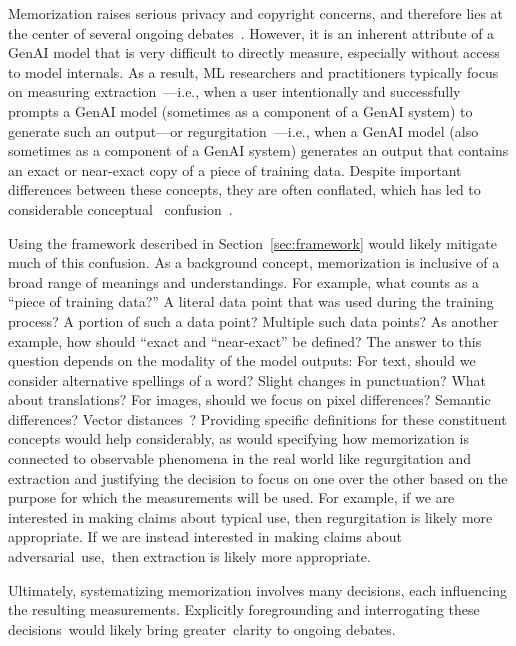 \documentclass{article}
\begin{document}
Memorization raises serious privacy and copyright concerns, and therefore lies at the center of several ongoing debates~\citep{lee2023talkin}. However, it is an inherent attribute of a GenAI model that is very difficult to directly measure, especially without access to model internals. As a result, ML researchers and practitioners typically focus on measuring extraction~\citep[e.g.,][]{carlini2023quantifying,nasr2023scalable,prashanth2024recite}---i.e., when a user intentionally and successfully prompts a GenAI model (sometimes as a component of a GenAI system) to generate such an output---or
regurgitation~\citep[e.g.,][]{aerni2024measuring}---i.e., when a GenAI model (also sometimes as a component of a GenAI system) generates an output that contains an exact or near-exact copy of a piece of training data. Despite important differences between these concepts, they are often conflated, which has led to considerable conceptual~ confusion~\cite{cooper2024files}.

Using the framework described in Section~\ref{sec:framework} would likely mitigate much of this confusion. As a background concept, memorization is inclusive of a broad range of meanings and understandings. For example, what counts as a ``piece of training data?'' A literal data point that was used during the training process? A portion of such a data point? Multiple such data points? As another example, how should ``exact and ``near-exact'' be defined? The answer to this question depends on the modality of the model outputs: For text, should we consider alternative spellings of a word? Slight changes in punctuation? What about translations? For images, should we 
focus on pixel differences? Semantic differences? Vector distances~\citep{carlini2023extracting, somepalli2022diffusion}?  Providing specific definitions for these constituent concepts would help considerably, as would specifying how memorization is connected to observable phenomena in the real world like regurgitation and extraction and justifying the decision to focus on one over the other based on the purpose for which the measurements will be used. For example, if we are interested in making claims about typical use, then regurgitation is likely more appropriate. If we are instead interested in making claims about adversarial~use,~then extraction is likely more appropriate.

Ultimately, systematizing memorization involves many decisions, each influencing the resulting measurements. Explicitly foregrounding and interrogating these decisions~would likely bring greater~clarity to ongoing debates.
\end{document}

